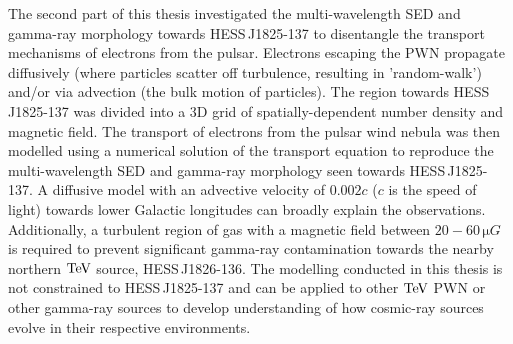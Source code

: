 The second part of this thesis investigated the multi-wavelength SED and gamma-ray morphology towards \mbox{HESS\,J1825-137} to disentangle the transport mechanisms of electrons from the pulsar. Electrons escaping the PWN propagate diffusively (where particles scatter off turbulence, resulting in 'random-walk') and/or via advection (the bulk motion of particles). The region towards \mbox{HESS\,J1825-137} was divided into a 3D grid of spatially-dependent number density and magnetic field. The transport of electrons from the pulsar wind nebula was then modelled using a numerical solution of the transport equation to reproduce the multi-wavelength SED and gamma-ray morphology seen towards \mbox{HESS\,J1825-137}. A diffusive model with an advective velocity of $0.002c$ ($c$ is the speed of light) towards lower Galactic longitudes can broadly explain the observations. Additionally, a turbulent region of gas with a magnetic field between $20-60\,\si{\micro G}$ is required to prevent significant gamma-ray contamination towards the nearby northern $\TeV$ source, \mbox{HESS\,J1826-136}.
\newpar
The modelling conducted in this thesis is not constrained to \mbox{HESS\,J1825-137} and can be applied to other $\TeV$ PWN or other gamma-ray sources to develop understanding of how cosmic-ray sources evolve in their respective environments.